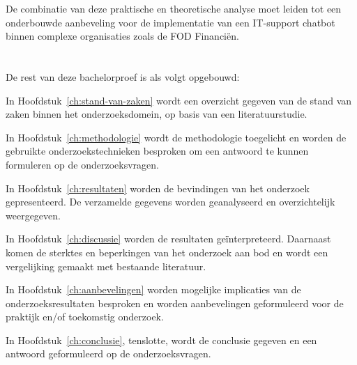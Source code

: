 De combinatie van deze praktische en theoretische analyse moet leiden tot een onderbouwde aanbeveling voor de implementatie van een IT-support chatbot binnen complexe organisaties zoals de FOD Financiën.

\section{}%
\label{sec:opzet-bachelorproef}

De rest van deze bachelorproef is als volgt opgebouwd:

In Hoofdstuk~\ref{ch:stand-van-zaken} wordt een overzicht gegeven van de stand van zaken binnen het onderzoeksdomein, op basis van een literatuurstudie.

In Hoofdstuk~\ref{ch:methodologie} wordt de methodologie toegelicht en worden de gebruikte onderzoekstechnieken besproken om een antwoord te kunnen formuleren op de onderzoeksvragen.

In Hoofdstuk~\ref{ch:resultaten} worden de bevindingen van het onderzoek gepresenteerd. De verzamelde gegevens worden geanalyseerd en overzichtelijk weergegeven.

In Hoofdstuk~\ref{ch:discussie} worden de resultaten geïnterpreteerd. Daarnaast komen de sterktes en beperkingen van het onderzoek aan bod en wordt een vergelijking gemaakt met bestaande literatuur.

In Hoofdstuk~\ref{ch:aanbevelingen} worden mogelijke implicaties van de onderzoeksresultaten besproken en worden aanbevelingen geformuleerd voor de praktijk en/of toekomstig onderzoek.

In Hoofdstuk~\ref{ch:conclusie}, tenslotte, wordt de conclusie gegeven en een antwoord geformuleerd op de onderzoeksvragen.
